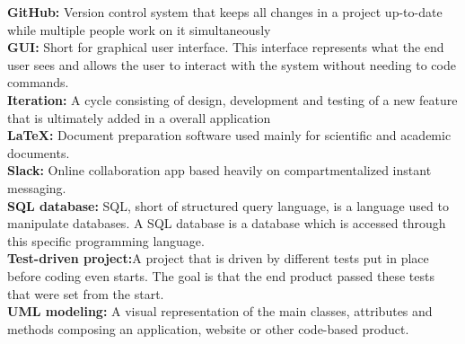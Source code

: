 \documentclass{article}
\begin{document}
\textbf{GitHub: }Version control system that keeps all changes in a project up-to-date while multiple people work on it simultaneously \\

\textbf{GUI: }Short for graphical user interface. This interface represents what the end user sees and allows the user to interact with the system without needing to code commands. \\

\textbf{Iteration: }A cycle consisting of design, development and testing of a new feature that is ultimately added in a overall application\\

\textbf{LaTeX: }Document preparation software used mainly for scientific and academic documents.\\

\textbf{Slack: }Online collaboration app based heavily on compartmentalized instant messaging.\\

\textbf{SQL database: }SQL, short of structured query language, is a language used to manipulate databases. A SQL database is a database which is accessed through this specific programming language.\\

\textbf{Test-driven project:}A project that is driven by different tests put in place before coding even starts. The goal is that the end product passed these tests that were set from the start.\\

\textbf{UML modeling: }A visual representation of the main classes, attributes and methods composing an application, website or other code-based product.\\
\end{document}
